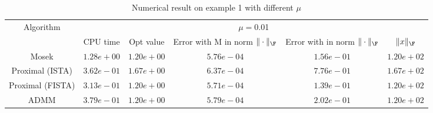 \begin{table}
\centering
\begin{tabular}{|c|c|c|c|c|c|}

\hline
\multirow{2}{*}{ Algorithm} &\multicolumn{5}{c|}{$\mu=$0.01}\\\cline{2-6}
 &CPU time &Opt value &Error with M in norm $\|\cdot\|_\F$ &Error with in norm $\|\cdot\|_\F$ &$\|x\|_\F$\\\hline
Mosek & $1.28e+00$ & $1.20e+00$ & $5.76e-04$ & $1.56e-01$ & $1.20e+02$\\\hline
Proximal (ISTA) & $3.62e-01$ & $1.67e+00$ & $6.37e-04$ & $7.76e-01$ & $1.67e+02$\\\hline
Proximal (FISTA) & $3.13e-01$ & $1.20e+00$ & $5.71e-04$ & $1.39e-01$ & $1.20e+02$\\\hline
ADMM & $3.79e-01$ & $1.20e+00$ & $5.79e-04$ & $2.02e-01$ & $1.20e+02$\\\hline
\end{tabular}
\caption{Numerical result on example 1 with different $\mu$\label{example1}}
\end{table}
